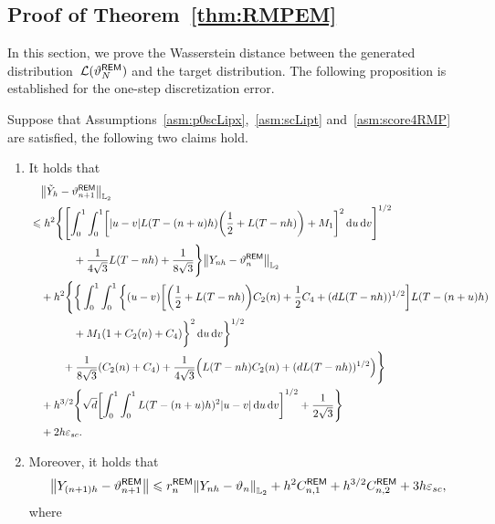 \subsection{Proof of Theorem~\ref{thm:RMPEM}}
\label{app:REM}
In this section, we prove the Wasserstein distance between the generated distribution~${\mathcal L}(\vartheta_N^{\sf REM})$ and the target distribution.
The following proposition is established for the one-step discretization error.
\begin{proposition}
    \label{prop:RMPEM}
    Suppose that Assumptions~\ref{asm:p0scLipx},~\ref{asm:scLipt} and~\ref{asm:score4RMP} are satisfied, the following two claims hold.
    \begin{enumerate}[label=\textbf{(\arabic*)}, leftmargin=2em]
        \item \label{item:REMtilde}
       It holds that
        \begin{align*}
            &\quad\l|\tilde{Y}_h-\vartheta_{n+1}^{\sf REM}\r|_{\Ltwo}\\
            &\leqslant h^2\Bigg\{\left[\int_0^1\int_0^1\left[|u-v|L(T-(n+u)h)\left(\dfrac{1}{2}+L(T-nh)\right)+M_1\right]^2\rmd u\rmd v\right]^{1/2}\\
            &\qquad\qquad+\dfrac{1}{4\sqrt{3}}L(T-nh)+\dfrac{1}{8\sqrt{3}}\Bigg\}\l|Y_{nh}-\vartheta_n^{\sf REM}\r|_{\Ltwo}\\
            &\quad+h^2\Bigg\{\bigg\{\int_0^1\int_0^1\bigg\{(u-v)\left[\left(\dfrac{1}{2}+L(T-nh)\right)C_2(n)+\dfrac{1}{2}C_4+(dL(T-nh))^{1/2}\right]L(T-(n+u)h)\\
            &\qquad\qquad+M_1(1+C_2(n)+C_4)\bigg\}^2\rmd u\rmd v\bigg\}^{1/2}\\
            &\qquad \quad+\dfrac{1}{8\sqrt{3}}(C_2(n)+C_4)+\dfrac{1}{4\sqrt{3}}\left(L(T-nh)C_2(n)+(dL(T-nh))^{1/2}\right)\Bigg\}\\
            &\quad +h^{3/2}\Bigg\{\sqrt{d}\left[\int_0^1\int_0^1L(T-(n+u)h)^2|u-v|\rmd u\rmd  v\right]^{1/2}+\dfrac{1}{2\sqrt{3}}\Bigg\}\\
            &\quad +2h\varepsilon_{sc}.
        \end{align*}
        \item \label{item:REMYt}
       Moreover, it holds that
        \begin{align*}
            \l|Y_{(n+1)h}-\vartheta_{n+1}^{\sf REM}\r|\leqslant r_n^{\sf REM}\l|Y_{nh}-\vartheta_n\r|_{\Ltwo}+h^2C_{n,1}^{\sf REM}+h^{3/2}C_{n,2}^{\sf REM}+3h\varepsilon_{sc},
        \end{align*}
        where
        \begin{align*}

\end{align*}
\end{enumerate}
\end{proposition}
